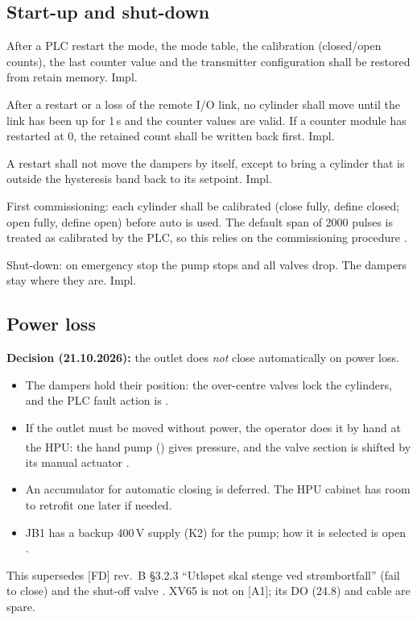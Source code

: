 \documentclass[11pt,a4paper]{article}
\newcommand{\prop}{\textsuperscript{\dag}}  %
\begin{document}
\subsection{Start-up and shut-down}
\begin{description}[nosep, leftmargin=14mm, style=sameline]
  \item[FR-9] After a PLC restart the mode, the mode table, the calibration (closed/open counts),
        the last counter value and the transmitter configuration shall be restored from retain
        memory. \hfill Impl.
  \item[FR-10] After a restart or a loss of the remote I/O link, no cylinder shall move until the
        link has been up for 1\,s and the counter values are valid. If a counter module has
        restarted at 0, the retained count shall be written back first. \hfill Impl.
  \item[FR-11] A restart shall not move the dampers by itself, except to bring a cylinder that
        is outside the hysteresis band back to its setpoint. \hfill Impl.
  \item[FR-12] First commissioning: each cylinder shall be calibrated (close fully, define closed;
        open fully, define open) before auto is used. The default span of 2000 pulses is treated as
        calibrated by the PLC, so this relies on the commissioning procedure .
  \item[FR-13] Shut-down: on emergency stop the pump stops and all valves drop. The dampers stay
        where they are. \hfill Impl.
\end{description}

\subsection{Power loss}
\label{sec:power}
\textbf{Decision  (21.10.2026):} the outlet does \emph{not} close automatically on
power loss.
\begin{itemize}[nosep]
  \item The dampers hold their position: the over-centre valves lock the cylinders, and the PLC
        fault action is .
  \item If the outlet must be moved without power, the operator does it by hand at the HPU: the hand
        pump (\prop) gives pressure, and the valve section is shifted by its manual
        actuator .
  \item An accumulator for automatic closing is deferred. The HPU cabinet has room to retrofit
        one later if needed.
  \item JB1 has a backup 400\,V supply (K2) for the pump; how it is selected is open .
\end{itemize}
This supersedes [FD] rev.~B §3.2.3 ``Utløpet skal stenge ved strømbortfall'' (fail to close) and the
shut-off valve . XV65 is not on [A1]; its DO (24.8) and cable are spare.
\end{document}

